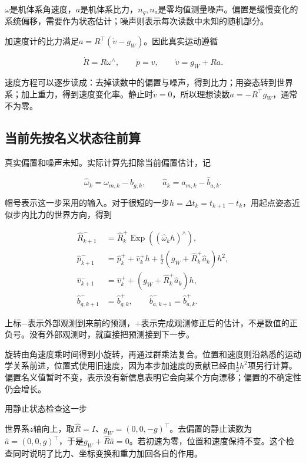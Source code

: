 $\omega$是机体系角速度，$a$是机体系比力，$n_g,n_a$是零均值测量噪声。偏置是缓慢变化的系统偏移，需要作为状态估计；噪声则表示每次读数中未知的随机部分。

加速度计的比力满足$a=R^\top(\dot v-g_W)$。因此真实运动遵循

\begin{equation*}
\dot R=R\omega^\wedge,\qquad\dot p=v,\qquad\dot v=g_W+Ra.
\end{equation*}

速度方程可以逐步读成：去掉读数中的偏置与噪声，得到比力；用姿态转到世界系；加上重力，得到速度变化率。静止时$\dot v=0$，所以理想读数$a=-R^\top g_W$，通常不为零。

\subsection{当前先按名义状态往前算}

真实偏置和噪声未知。实际计算先扣除当前偏置估计，记

\begin{equation*}
\hat\omega_k=\omega_{m,k}-\hat b_{g,k},\qquad
 \hat a_k=a_{m,k}-\hat b_{a,k}.
\end{equation*}

帽号表示这一步采用的输入。对于很短的一步$h=\Delta t_k=t_{k+1}-t_k$，用起点姿态近似步内比力的世界方向，得到

\begin{equation}\label{eq-eskf-nominal-step}
\begin{aligned}
 \hat R_{k+1}^-&=\hat R_k^+\mathop{\mathrm{Exp}}((\hat\omega_kh)^\wedge),\\
 \hat p_{k+1}^-&=\hat p_k^++\hat v_k^+h
                 +\tfrac12(g_W+\hat R_k^+\hat a_k)h^2,\\
 \hat v_{k+1}^-&=\hat v_k^++(g_W+\hat R_k^+\hat a_k)h,\\
 \hat b_{g,k+1}^-&=\hat b_{g,k}^+,
 \qquad\hat b_{a,k+1}^-=\hat b_{a,k}^+.
\end{aligned}
\end{equation}

上标$-$表示外部观测到来前的预测，$+$表示完成观测修正后的估计，不是数值的正负号。没有外部观测时，就直接把预测接到下一步。

旋转由角速度乘时间得到小旋转，再通过群乘法复合。位置和速度则沿熟悉的运动学关系前进，位置式使用旧速度，因为本步加速度的贡献已经由$\tfrac12h^2$项另行计算。偏置名义值暂时不变，表示没有新信息表明它会向某个方向漂移；偏置的不确定性仍会增长。

\begin{bookexample}{用静止状态检查这一步}

世界系$z$轴向上，取$\hat R=I$、$g_W=(0,0,-g)^\top$。去偏置的静止读数为$\hat a=(0,0,g)^\top$，于是$g_W+\hat R\hat a=0$。若初速为零，位置和速度保持不变。这个检查同时说明了比力、坐标变换和重力加回各自的作用。

\end{bookexample}

